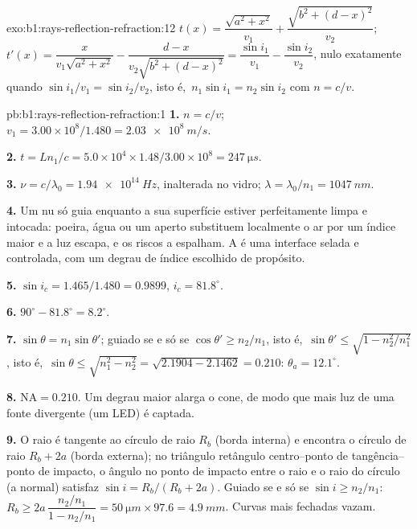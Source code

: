 \begin{solution}{exo:b1:rays-reflection-refraction:12}
$t(x) = \dfrac{\sqrt{a^2 + x^2}}{v_1} + \dfrac{\sqrt{b^2 + (d - x)^2}}{v_2}$;
$t'(x) = \dfrac{x}{v_1\sqrt{a^2 + x^2}} - \dfrac{d - x}{v_2\sqrt{b^2 + (d - x)^2}}
= \dfrac{\sin i_1}{v_1} - \dfrac{\sin i_2}{v_2}$, nulo exatamente quando
$\sin i_1/v_1 = \sin i_2/v_2$, isto é,\ $n_1\sin i_1 = n_2\sin i_2$ com
$n = c/v$.
\end{solution}

\begin{solution}{pb:b1:rays-reflection-refraction:1}
\textbf{1.} $n = c/v$; $v_1 = 3.00\times10^8/1.480 = \qty{2.03e8}{m/s}$.

\textbf{2.} $t = Ln_1/c = 5.0\times10^4 \times 1.48/3.00\times10^8 =
\qty{247}{\micro s}$.

\textbf{3.} $\nu = c/\lambda_0 = \qty{1.94e14}{Hz}$, inalterada no vidro;
$\lambda = \lambda_0/n_1 = \qty{1047}{nm}$.

\textbf{4.} Um  nu só guia enquanto a sua superfície estiver
perfeitamente limpa e intocada: poeira, água ou um aperto substituem
localmente o ar por um índice maior e a luz escapa, e os riscos a espalham.
A  é uma interface selada e controlada, com um degrau de índice escolhido de propósito.

\textbf{5.} $\sin i_c = 1.465/1.480 = 0.9899$, $i_c = 81.8^\circ$.

\textbf{6.} $90^\circ - 81.8^\circ = 8.2^\circ$.

\textbf{7.} $\sin\theta = n_1\sin\theta'$; guiado se e só se $\cos\theta' \geq
n_2/n_1$, isto é,\ $\sin\theta' \leq \sqrt{1 - n_2^2/n_1^2}$, isto é,\
$\sin\theta \leq \sqrt{n_1^2 - n_2^2} = \sqrt{2.1904 - 2.1462} = 0.210$:
$\theta_a = 12.1^\circ$.

\textbf{8.} $\mathrm{NA} = 0.210$. Um degrau maior alarga o cone, de modo que
mais luz de uma fonte divergente (um LED) é captada.

\textbf{9.} O raio é tangente ao círculo de raio $R_b$ (borda
interna) e encontra o círculo de raio $R_b + 2a$ (borda externa); no
triângulo retângulo centro--ponto de tangência--ponto de impacto, o ângulo no
ponto de impacto entre o raio e o raio do círculo (a normal) satisfaz
$\sin i = R_b/(R_b + 2a)$. Guiado se e só se $\sin i \geq n_2/n_1$:
$R_b \geq 2a\,\dfrac{n_2/n_1}{1 - n_2/n_1} = \qty{50}{\micro m} \times 97.6
= \qty{4.9}{mm}$. Curvas mais fechadas vazam.


\end{solution}
